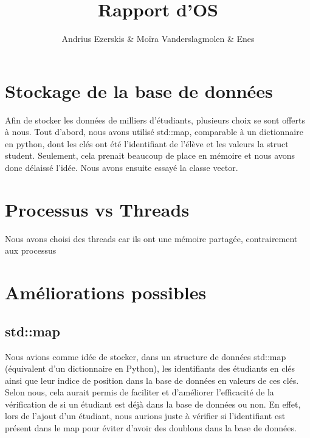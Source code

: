 \documentclass{article}
\title{Rapport d'OS}
\author{Andrius Ezerskis \& Moïra Vanderslagmolen \& Enes}
\begin{document}

\section{Stockage de la base de données}

Afin de stocker les données de milliers d'étudiants, plusieurs choix se sont offerts à nous. 
Tout d'abord, nous avons utilisé std::map, comparable à un dictionnaire en python, dont les
clés ont été l'identifiant de l'élève et les valeurs la struct student. Seulement, cela
prenait beaucoup de place en mémoire et nous avons donc délaissé l'idée. Nous avons ensuite essayé
la classe vector.

\section{Processus vs Threads}
Nous avons choisi des threads car ils ont une mémoire partagée, contrairement aux processus
\section{Améliorations possibles}
    \subsection{std::map}
    Nous avions comme idée de stocker, dans un structure de données std::map (équivalent d'un dictionnaire en Python), les identifiants des étudiants en clés ainsi que leur indice de position dans la base de données en valeurs de ces clés. \newline
    Selon nous, cela aurait permis de faciliter et d'améliorer l'efficacité de la vérification de si un étudiant est déjà dans la base de données ou non. \newline En effet, lors de l'ajout d'un étudiant, nous aurions juste à vérifier si l'identifiant est présent dans le map pour éviter d'avoir des doublons dans la base de données.
\end{document}
